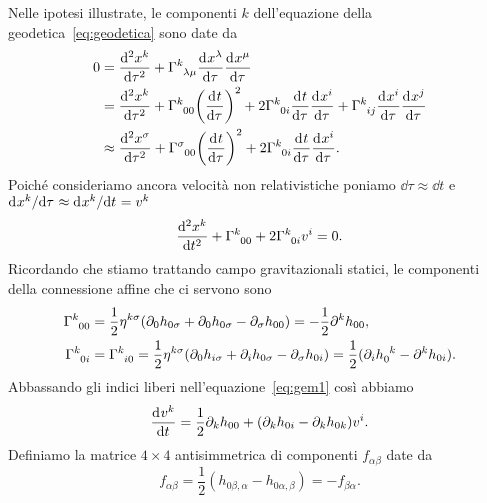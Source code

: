 Nelle ipotesi illustrate, le componenti $k$ dell'equazione della
geodetica~\eqref{eq:geodetica} sono date da
\begin{equation}
    \begin{split}
    0 &= \toder[2]{x^{k}}{\tau} + \tensor{\Gamma}{^{k}_{\lambda\mu}}
    \toder{x^{\lambda}}{\tau} \toder{x^{\mu}}{\tau} \\
    &= \toder[2]{x^{k}}{\tau} + \tensor{\Gamma}{^{k}_{00}} \bigg(
    \toder{t}{\tau} \bigg)^{2} + 2\tensor{\Gamma}{^{k}_{0i}}\toder{t}{\tau}
    \toder{x^{i}}{\tau} + \tensor{\Gamma}{^{k}_{ij}} \toder{x^{i}}{\tau}
    \toder{x^{j}}{\tau} \\
    &\approx \toder[2]{x^{\sigma}}{\tau} + \tensor{\Gamma}{^{\sigma}_{00}}\bigg(
    \toder{t}{\tau} \bigg)^{2} + 2\tensor{\Gamma}{^{k}_{0i}}\toder{t}{\tau}
    \toder{x^{i}}{\tau}.
  \end{split}
\end{equation}
Poiché consideriamo ancora velocità non relativistiche poniamo
$\dd \tau \approx \dd t$ e
$\mathrm{d}^{}x^{k} / \mathrm{d} {\tau}^{} \approx \mathrm{d}^{}x^{k} / \mathrm{d} {t}^{} = v^{k}$
\begin{equation}
  \label{eq:gem1}
  \toder[2]{x^{k}}{t} + \tensor{\Gamma}{^{k}_{00}} +
  2\tensor{\Gamma}{^{k}_{0i}}v^{i} = 0.
\end{equation}
Ricordando che stiamo trattando campo gravitazionali statici, le componenti
della connessione affine che ci servono sono
\begin{subequations}
  \begin{align}
    \tensor{\Gamma}{^{k}_{00}} &=
    \frac{1}{2}\eta^{k\sigma}(\partial_{0}h_{0\sigma} + \partial_{0}h_{0\sigma}
    - \partial_{\sigma}h_{00}) = - \frac{1}{2}\partial^{k}h_{00}, \\
    \tensor{\Gamma}{^{k}_{0i}} &= \tensor{\Gamma}{^{k}_{i0}} =
    \frac{1}{2}\eta^{k\sigma} (\partial_{0}h_{i\sigma} + \partial_{i}h_{0\sigma}
    - \partial_{\sigma}h_{0i}) = \frac{1}{2}(\partial_{i}\tensor{h}{_{0}^{k}}
    - \partial^{k}h_{0i}).
  \end{align}
\end{subequations}
Abbassando gli indici liberi nell'equazione~\eqref{eq:gem1} così abbiamo
\begin{equation}
  \label{eq:gem2}
  \frac{{\mathop{}\!\mathrm{d}^{}}v^{k}}{\mathop{}\!\mathrm{d} {t}^{}} = \frac{1}{2}\partial_{k}h_{00} + (\partial_{k}h_{0i}
  - \partial_{k}h_{0k})v^{i}.
\end{equation}
Definiamo la matrice $4 \times 4$ antisimmetrica di componenti $f_{\alpha\beta}$
date da
\begin{equation}
  f_{\alpha\beta} = \frac{1}{2}(h_{0\beta,\alpha} - h_{0\alpha,\beta}) =
  -f_{\beta\alpha}.
\end{equation}
